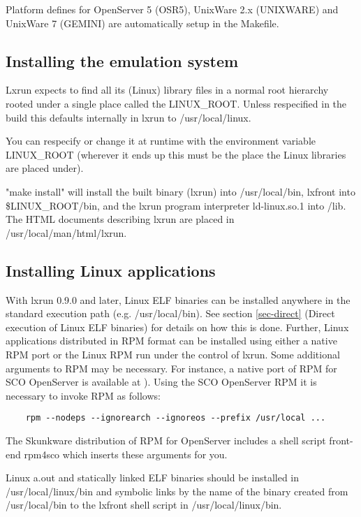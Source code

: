 \documentclass[letterpaper]{article}
\begin{document}
Platform defines for OpenServer 5 (OSR5), UnixWare 2.x (UNIXWARE) 
and UnixWare 7 (GEMINI) are automatically setup in the Makefile.




\subsection{Installing the emulation system}

Lxrun expects to find all its (Linux) library files in a normal root hierarchy
rooted under a single place called the LINUX\_ROOT.
Unless respecified in the build this defaults internally in lxrun to
/usr/local/linux.

You can respecify or change it at runtime with the environment variable
LINUX\_ROOT (wherever it ends up this must be the place the Linux 
libraries are placed under).

"make install" will install the built binary (lxrun) into /usr/local/bin,
lxfront into \$LINUX\_ROOT/bin, and the lxrun program interpreter
ld-linux.so.1 into /lib. The HTML documents describing lxrun are placed
in /usr/local/man/html/lxrun.




\subsection{Installing Linux applications}



With lxrun 0.9.0 and later, Linux ELF binaries can be installed anywhere in
the standard execution path (e.g. /usr/local/bin). See section
\ref{sec-direct} {(Direct execution of Linux ELF binaries)}
for details on how this is done. Further, Linux applications distributed in 
RPM format can be installed using either a native RPM port 
or the Linux RPM run under the control of lxrun. Some additional arguments
to RPM may be necessary. For instance, a native port of RPM for SCO OpenServer 
is available at ).
Using the SCO OpenServer RPM it is necessary to invoke RPM as follows:
\begin{verbatim}
    rpm --nodeps --ignorearch --ignoreos --prefix /usr/local ...
\end{verbatim}

The Skunkware distribution of RPM for OpenServer includes a shell script
front-end {\ttfamily rpm4sco} which inserts these arguments for you.

Linux a.out and statically linked ELF binaries should be installed in 
/usr/local/linux/bin and symbolic links by the name of the binary created 
from /usr/local/bin to the lxfront shell script in /usr/local/linux/bin.
\end{document}
